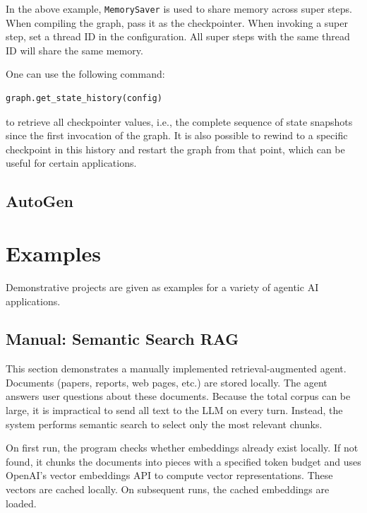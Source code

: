 In the above example, \texttt{MemorySaver} is used to share memory across super steps. When compiling the graph, pass it as the checkpointer. When invoking a super step, set a thread ID in the configuration. All super steps with the same thread ID will share the same memory.

One can use the following command:
\begin{lstlisting}
graph.get_state_history(config)
\end{lstlisting}
to retrieve all checkpointer values, i.e., the complete sequence of state snapshots since the first invocation of the graph. It is also possible to rewind to a specific checkpoint in this history and restart the graph from that point, which can be useful for certain applications.



















\subsection{AutoGen}

\section{Examples}

Demonstrative projects are given as examples for a variety of agentic AI applications. 

\subsection{Manual: Semantic Search RAG}

This section demonstrates a manually implemented retrieval‑augmented agent. Documents (papers, reports, web pages, etc.) are stored locally. The agent answers user questions about these documents. Because the total corpus can be large, it is impractical to send all text to the LLM on every turn. Instead, the system performs semantic search to select only the most relevant chunks.

On first run, the program checks whether embeddings already exist locally. If not found, it chunks the documents into pieces with a specified token budget and uses OpenAI’s vector embeddings API to compute vector representations. These vectors are cached locally. On subsequent runs, the cached embeddings are loaded.

